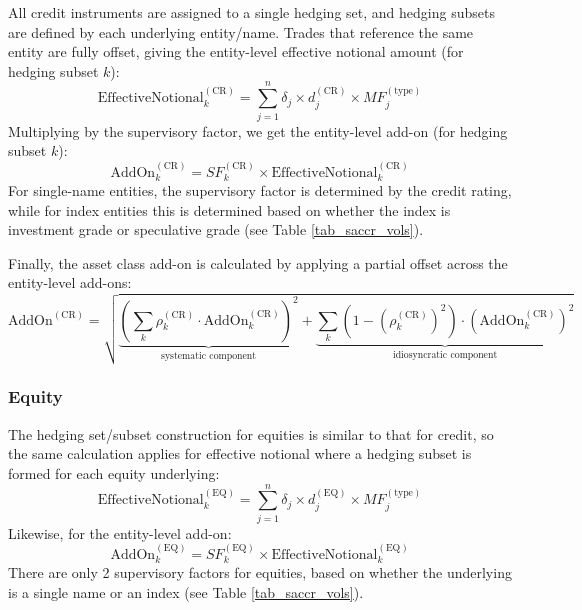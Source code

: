 All credit instruments are assigned to a single hedging set, and hedging subsets are defined by each underlying
entity/name. Trades that reference the same entity are fully offset, giving the entity-level effective notional
amount (for hedging subset $k$):
\begin{equation*}
  \text{EffectiveNotional}_k^{(\text{CR})} = \sum_{j=1}^n \delta_j \times d_j^{(\text{CR})} \times MF_j^{(\text{type})}
\end{equation*}
Multiplying by the supervisory factor, we get the entity-level add-on (for hedging subset $k$):
\begin{equation*}
  \text{AddOn}_k^{(\text{CR})} = SF_k^{(\text{CR})} \times \text{EffectiveNotional}_k^{(\text{CR})}
\end{equation*}
For single-name entities, the supervisory factor is determined by the credit rating, while for index entities this is
determined based on whether the index is investment grade or speculative grade (see Table \ref{tab_saccr_vols}).

Finally, the asset class add-on is calculated by applying a partial offset across the entity-level add-ons:
\begin{equation*}
  {\text{AddOn}^{(\text{CR})} = \sqrt{ \underbrace{\left(\sum_k \rho_k^{(\text{CR})} \cdot \text{AddOn}_k^{(\text{CR})} \right)^2}_{\mbox{systematic component}} + \underbrace{\sum_k \left( 1 - \left( \rho_k^{(\text{CR})} \right)^2 \right) \cdot \left(\text{AddOn}_k^{(\text{CR})}\right)^2}_{\mbox{idiosyncratic component}} }}
\end{equation*}

\subsubsection*{Equity}

The hedging set/subset construction for equities is similar to that for credit, so the same calculation applies for effective notional where a hedging subset is formed for each equity underlying:
\begin{equation*}
  \text{EffectiveNotional}_k^{(\text{EQ})} = \sum_{j=1}^n \delta_j \times d_j^{(\text{EQ})} \times MF_j^{(\text{type})}
\end{equation*}
Likewise, for the entity-level add-on:
\begin{equation*}
  \text{AddOn}_k^{(\text{EQ})} = SF_k^{(\text{EQ})} \times \text{EffectiveNotional}_k^{(\text{EQ})}
\end{equation*}
There are only 2 supervisory factors for equities, based on whether the underlying is a single name or an index
(see Table \ref{tab_saccr_vols}).

